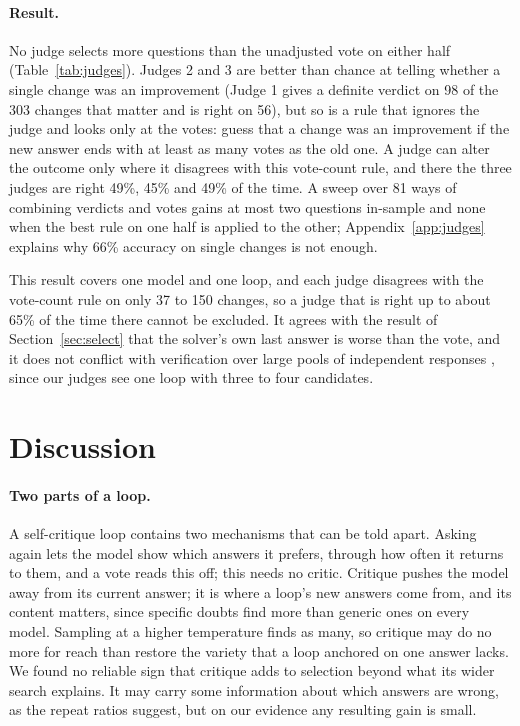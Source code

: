 \documentclass[11pt]{article}
\begin{document}
\paragraph{Result.}
No judge selects more questions than the unadjusted vote on either half (Table~\ref{tab:judges}).
Judges 2 and 3 are better than chance at telling whether a single change was an improvement (Judge 1 gives a definite verdict on 98 of the 303 changes that matter and is right on 56), but so is a rule that ignores the judge and looks only at the votes: guess that a change was an improvement if the new answer ends with at least as many votes as the old one.
A judge can alter the outcome only where it disagrees with this vote-count rule, and there the three judges are right 49\%, 45\% and 49\% of the time.
A sweep over 81 ways of combining verdicts and votes gains at most two questions in-sample and none when the best rule on one half is applied to the other; Appendix~\ref{app:judges} explains why 66\% accuracy on single changes is not enough.

This result covers one model and one loop, and each judge disagrees with the vote-count rule on only 37 to 150 changes, so a judge that is right up to about 65\% of the time there cannot be excluded.
It agrees with the result of Section~\ref{sec:select} that the solver's own last answer is worse than the vote, and it does not conflict with verification over large pools of independent responses \citep{zhao2025sample}, since our judges see one loop with three to four candidates.

\section{Discussion}

\paragraph{Two parts of a loop.}
A self-critique loop contains two mechanisms that can be told apart.
Asking again lets the model show which answers it prefers, through how often it returns to them, and a vote reads this off; this needs no critic.
Critique pushes the model away from its current answer; it is where a loop's new answers come from, and its content matters, since specific doubts find more than generic ones on every model.
Sampling at a higher temperature finds as many, so critique may do no more for reach than restore the variety that a loop anchored on one answer lacks.
We found no reliable sign that critique adds to selection beyond what its wider search explains.
It may carry some information about which answers are wrong, as the repeat ratios suggest, but on our evidence any resulting gain is small.
\end{document}
